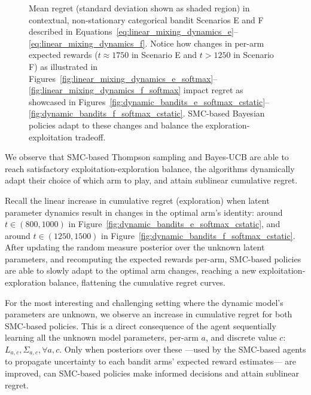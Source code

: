 \begin{figure}[!ht]
	\caption{
		Mean regret (standard deviation shown as shaded region) in contextual, non-stationary categorical bandit Scenarios E and F
		described in Equations~\eqref{eq:linear_mixing_dynamics_e}--\eqref{eq:linear_mixing_dynamics_f}.
		Notice how changes in per-arm expected rewards ($t\approx1750$ in Scenario E and $t>1250$ in Scenario F) 
		as illustrated in Figures~\ref{fig:linear_mixing_dynamics_e_softmax}--\ref{fig:linear_mixing_dynamics_f_softmax}
		impact regret
		as showcased in Figures~\ref{fig:dynamic_bandits_e_softmax_cstatic}--\ref{fig:dynamic_bandits_f_softmax_cstatic}.
		SMC-based Bayesian policies adapt to these changes and balance the exploration-exploitation tradeoff.
	}
	\label{fig:dynamic_bandits_softmax}
\vspace*{-2ex}
\end{figure}

We observe that SMC-based Thompson sampling and Bayes-UCB are able to reach
satisfactory exploitation-exploration balance,
\ie the algorithms dynamically adapt their choice of which arm to play, and attain sublinear cumulative regret.

Recall the linear increase in cumulative regret (\ie exploration)
when latent parameter dynamics result in changes in the optimal arm's identity:
around $t\in (800,1000)$ in Figure~\ref{fig:dynamic_bandits_e_softmax_cstatic},
and around $t\in (1250,1500)$ in Figure~\ref{fig:dynamic_bandits_f_softmax_cstatic}.
%
After updating the random measure posterior over the unknown latent parameters,
and recomputing the expected rewards per-arm,
SMC-based policies are able to slowly adapt to the optimal arm changes,
reaching a new exploitation-exploration balance, \ie flattening the cumulative regret curves.

For the most interesting and challenging setting where the dynamic model's parameters are unknown,
we observe an increase in cumulative regret for both SMC-based policies.
This is a direct consequence of
the agent sequentially learning all the unknown model parameters,
per-arm $a$, and discrete value $c$: $L_{a,c}, \Sigma_{a,c}, \forall a,c$.
%
Only when posteriors over these 
---used by the SMC-based agents to propagate uncertainty to each bandit arms' expected reward estimates---
are improved,
can SMC-based policies make informed decisions and attain sublinear regret.

